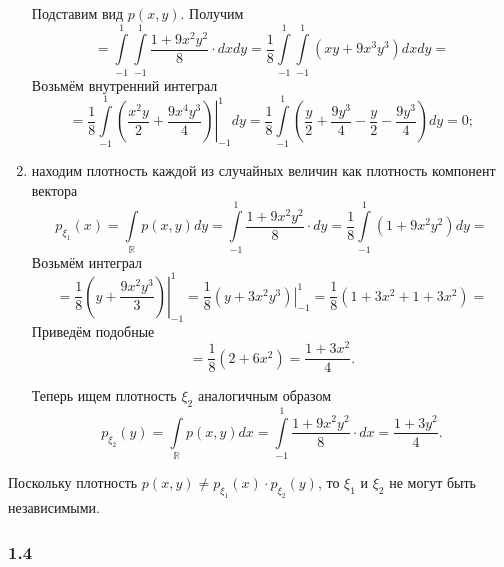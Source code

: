 \begin{enumerate}[label=\alph*)]
\begin{equation*}
  \end{equation*}
  Подставим вид $p \left( x, y \right) $.
  Получим
  \begin{equation*}
    = \int \limits_{-1}^1
      \int \limits_{-1}^1 \frac{1 + 9x^2 y^2}{8} \cdot dx
    dy =
    \frac{1}{8}
    \int \limits_{-1}^1 \int \limits_{-1}^1 \left( xy + 9x^3 y^3 \right) dxdy =
  \end{equation*}
  Возьмём внутренний интеграл
  \begin{equation*}
    = \frac{1}{8} \int \limits_{-1}^1
      \left. \left( \frac{x^2 y}{2} + \frac{9x^4 y^3}{4} \right) \right|_{-1}^1
    dy =
    \frac{1}{8} \int \limits_{-1}^1
      \left( \frac{y}{2} + \frac{9y^3}{4} - \frac{y}{2} - \frac{9y^3}{4} \right)
    dy =
    0;
  \end{equation*}
  \item находим плотность
  каждой из случайных величин как плотность компонент вектора
  \begin{equation*}
    p_{ \xi_1} \left( x \right) =
    \int \limits_{ \mathbb{R}} p \left( x, y \right) dy =
    \int \limits_{-1}^1 \frac{1 + 9x^2 y^2}{8} \cdot dy =
    \frac{1}{8} \int \limits_{-1}^1 \left( 1 + 9x^2 y^2 \right) dy =
  \end{equation*}
  Возьмём интеграл
  \begin{equation*}
    = \frac{1}{8} \left. \left( y + \frac{9x^2 y^3}{3} \right) \right|_{-1}^1 =
    \frac{1}{8} \left. \left( y + 3x^2 y^3 \right) \right|_{-1}^1 =
    \frac{1}{8} \left( 1 + 3x^2 + 1 + 3x^2 \right) =
  \end{equation*}
  Приведём подобные
  \begin{equation*}
    = \frac{1}{8} \left( 2 + 6x^2 \right) =
    \frac{1 + 3x^2}{4}.
  \end{equation*}

  Теперь ищем плотность $ \xi_2$ аналогичным образом
  \begin{equation*}
    p_{ \xi_2} \left( y \right) =
    \int \limits_{ \mathbb{R}} p \left( x, y \right) dx =
    \int \limits_{-1}^1 \frac{1 + 9x^2 y^2}{8} \cdot dx =
    \frac{1 + 3y^2}{4}.
  \end{equation*}
\end{enumerate}

Поскольку плотность
$p \left( x, y \right) \neq
 p_{ \xi_1} \left( x \right) \cdot p_{ \xi_2} \left( y \right) $,
то $ \xi_1$ и $ \xi_2$ не могут быть независимыми.

\subsubsection*{1.4}


